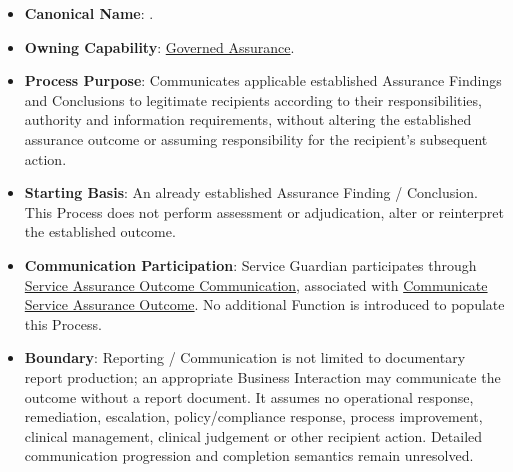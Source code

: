 \begin{itemize}

\item
\textbf{Canonical Name}: \texttt{}.



\item
\textbf{Owning Capability}: \hyperref[rad:enabling:694]{Governed Assurance}.



\item
\textbf{Process Purpose}: Communicates applicable established Assurance Findings and Conclusions to legitimate recipients according to their responsibilities, authority and information requirements, without altering the established assurance outcome or assuming responsibility for the recipient's subsequent action.



\item
\textbf{Starting Basis}: An already established Assurance Finding /\allowbreak{} Conclusion. This Process does not perform assessment or adjudication, alter or reinterpret the established outcome.



\item
\textbf{Communication Participation}: Service Guardian participates through \href{https://github.com/fhirfactory/harmonia/blob/98410db60155198a75f74c79d98060070209faa1/docs/markdown/03-business-architecture/collaborations-interactions/interactions.md\#service-assurance-outcome-communication}{Service Assurance Outcome Communication}, associated with \href{https://github.com/fhirfactory/harmonia/blob/98410db60155198a75f74c79d98060070209faa1/docs/markdown/03-business-architecture/behaviours/health-service-assurance.md\#communicate-service-assurance-outcome}{Communicate Service Assurance Outcome}. No additional Function is introduced to populate this Process.



\item
\textbf{Boundary}: Reporting /\allowbreak{} Communication is not limited to documentary report production; an appropriate Business Interaction may communicate the outcome without a report document. It assumes no operational response, remediation, escalation, policy/\allowbreak{}compliance response, process improvement, clinical management, clinical judgement or other recipient action. Detailed communication progression and completion semantics remain unresolved.



\end{itemize}
\label{rad:processes:398}
